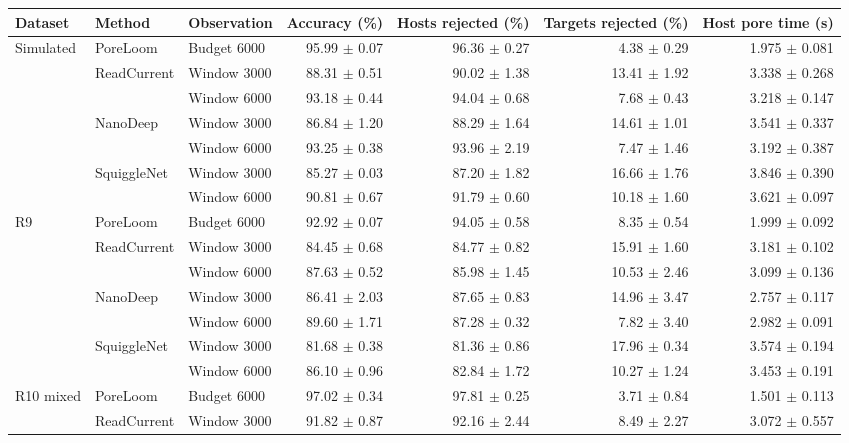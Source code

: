 \begingroup\setlength{\tabcolsep}{3.5pt}
\begin{tabular}{@{}lllrrrr@{}}\toprule
Dataset & Method & Observation & Accuracy (\%) & Hosts rejected (\%) & Targets rejected (\%) & Host pore time (s)\\\midrule
Simulated & PoreLoom & Budget 6000 & 95.99 $\pm$ 0.07 & 96.36 $\pm$ 0.27 & 4.38 $\pm$ 0.29 & 1.975 $\pm$ 0.081\\
 & ReadCurrent & Window 3000 & 88.31 $\pm$ 0.51 & 90.02 $\pm$ 1.38 & 13.41 $\pm$ 1.92 & 3.338 $\pm$ 0.268\\
 &  & Window 6000 & 93.18 $\pm$ 0.44 & 94.04 $\pm$ 0.68 & 7.68 $\pm$ 0.43 & 3.218 $\pm$ 0.147\\
 & NanoDeep & Window 3000 & 86.84 $\pm$ 1.20 & 88.29 $\pm$ 1.64 & 14.61 $\pm$ 1.01 & 3.541 $\pm$ 0.337\\
 &  & Window 6000 & 93.25 $\pm$ 0.38 & 93.96 $\pm$ 2.19 & 7.47 $\pm$ 1.46 & 3.192 $\pm$ 0.387\\
 & SquiggleNet & Window 3000 & 85.27 $\pm$ 0.03 & 87.20 $\pm$ 1.82 & 16.66 $\pm$ 1.76 & 3.846 $\pm$ 0.390\\
 &  & Window 6000 & 90.81 $\pm$ 0.67 & 91.79 $\pm$ 0.60 & 10.18 $\pm$ 1.60 & 3.621 $\pm$ 0.097\\
\addlinespace
R9 & PoreLoom & Budget 6000 & 92.92 $\pm$ 0.07 & 94.05 $\pm$ 0.58 & 8.35 $\pm$ 0.54 & 1.999 $\pm$ 0.092\\
 & ReadCurrent & Window 3000 & 84.45 $\pm$ 0.68 & 84.77 $\pm$ 0.82 & 15.91 $\pm$ 1.60 & 3.181 $\pm$ 0.102\\
 &  & Window 6000 & 87.63 $\pm$ 0.52 & 85.98 $\pm$ 1.45 & 10.53 $\pm$ 2.46 & 3.099 $\pm$ 0.136\\
 & NanoDeep & Window 3000 & 86.41 $\pm$ 2.03 & 87.65 $\pm$ 0.83 & 14.96 $\pm$ 3.47 & 2.757 $\pm$ 0.117\\
 &  & Window 6000 & 89.60 $\pm$ 1.71 & 87.28 $\pm$ 0.32 & 7.82 $\pm$ 3.40 & 2.982 $\pm$ 0.091\\
 & SquiggleNet & Window 3000 & 81.68 $\pm$ 0.38 & 81.36 $\pm$ 0.86 & 17.96 $\pm$ 0.34 & 3.574 $\pm$ 0.194\\
 &  & Window 6000 & 86.10 $\pm$ 0.96 & 82.84 $\pm$ 1.72 & 10.27 $\pm$ 1.24 & 3.453 $\pm$ 0.191\\
\addlinespace
R10 mixed & PoreLoom & Budget 6000 & 97.02 $\pm$ 0.34 & 97.81 $\pm$ 0.25 & 3.71 $\pm$ 0.84 & 1.501 $\pm$ 0.113\\
 & ReadCurrent & Window 3000 & 91.82 $\pm$ 0.87 & 92.16 $\pm$ 2.44 & 8.49 $\pm$ 2.27 & 3.072 $\pm$ 0.557\\

\end{tabular}
